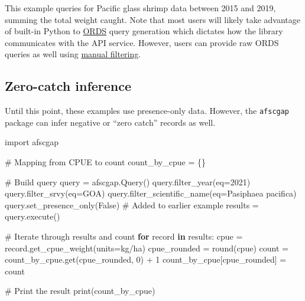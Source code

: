 \documentclass[
  letterpaper,
  oneside,
  open=any]{scrbook}
\newenvironment{Shaded}{\begin{snugshade}}{\end{snugshade}}
\newcommand{\AttributeTok}[1]{\textcolor[rgb]{0.40,0.45,0.13}{#1}}
\newcommand{\CommentTok}[1]{\textcolor[rgb]{0.37,0.37,0.37}{#1}}
\newcommand{\ControlFlowTok}[1]{\textcolor[rgb]{0.00,0.23,0.31}{\textbf{#1}}}
\newcommand{\DecValTok}[1]{\textcolor[rgb]{0.68,0.00,0.00}{#1}}
\newcommand{\FunctionTok}[1]{\textcolor[rgb]{0.28,0.35,0.67}{#1}}
\newcommand{\NormalTok}[1]{\textcolor[rgb]{0.00,0.23,0.31}{#1}}
\newcommand{\OtherTok}[1]{\textcolor[rgb]{0.00,0.23,0.31}{#1}}
\newcommand{\SpecialCharTok}[1]{\textcolor[rgb]{0.37,0.37,0.37}{#1}}
\newcommand{\StringTok}[1]{\textcolor[rgb]{0.13,0.47,0.30}{#1}}
\begin{document}
This example queries for Pacific glass shrimp data between 2015 and
2019, summing the total weight caught. Note that most users will likely
take advantage of built-in Python to
\href{https://www.oracle.com/database/technologies/appdev/rest.html}{ORDS}
query generation which dictates how the library communicates with the
API service. However, users can provide raw ORDS queries as well using
\href{https://pyafscgap.org/devdocs/afscgap.html\#manual-filtering}{manual
filtering}.

\subsection{Zero-catch inference}\label{zero-catch-inference}

Until this point, these examples use presence-only data. However, the
\texttt{afscgap} package can infer negative or ``zero catch'' records as
well.

\begin{Shaded}
\begin{Highlighting}[]
\NormalTok{import afscgap}

\CommentTok{\# Mapping from CPUE to count}
\NormalTok{count\_by\_cpue }\OtherTok{=}\NormalTok{ \{\}}

\CommentTok{\# Build query}
\NormalTok{query }\OtherTok{=} \FunctionTok{afscgap.Query}\NormalTok{()}
\FunctionTok{query.filter\_year}\NormalTok{(}\AttributeTok{eq=}\DecValTok{2021}\NormalTok{)}
\FunctionTok{query.filter\_srvy}\NormalTok{(}\AttributeTok{eq=}\StringTok{\textquotesingle{}GOA\textquotesingle{}}\NormalTok{)}
\FunctionTok{query.filter\_scientific\_name}\NormalTok{(}\AttributeTok{eq=}\StringTok{\textquotesingle{}Pasiphaea pacifica\textquotesingle{}}\NormalTok{)}
\FunctionTok{query.set\_presence\_only}\NormalTok{(False)  }\CommentTok{\# Added to earlier example}
\NormalTok{results }\OtherTok{=} \FunctionTok{query.execute}\NormalTok{()}

\CommentTok{\# Iterate through results and count}
\ControlFlowTok{for}\NormalTok{ record }\ControlFlowTok{in}\NormalTok{ results}\SpecialCharTok{:}
\NormalTok{  cpue }\OtherTok{=} \FunctionTok{record.get\_cpue\_weight}\NormalTok{(}\AttributeTok{units=}\StringTok{\textquotesingle{}kg/ha\textquotesingle{}}\NormalTok{)}
\NormalTok{  cpue\_rounded }\OtherTok{=} \FunctionTok{round}\NormalTok{(cpue)}
\NormalTok{  count }\OtherTok{=} \FunctionTok{count\_by\_cpue.get}\NormalTok{(cpue\_rounded, }\DecValTok{0}\NormalTok{) }\SpecialCharTok{+} \DecValTok{1}
\NormalTok{  count\_by\_cpue[cpue\_rounded] }\OtherTok{=}\NormalTok{ count}

\CommentTok{\# Print the result}
\FunctionTok{print}\NormalTok{(count\_by\_cpue)}
\end{Highlighting}
\end{Shaded}
\end{document}
